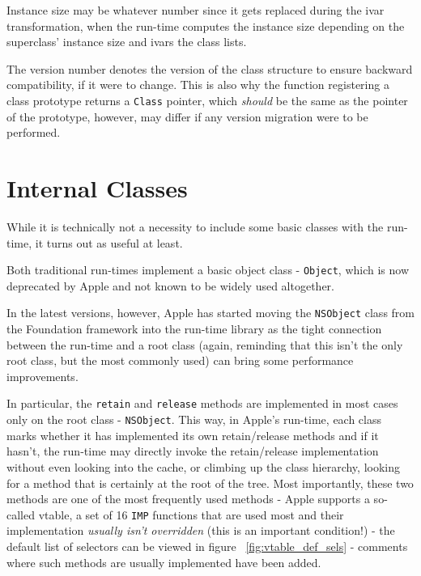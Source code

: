 Instance size may be whatever number since it gets replaced during the ivar transformation, when the run-time computes the instance size depending on the superclass' instance size and ivars the class lists.

The version number denotes the version of the class structure to ensure backward compatibility, if it were to change. This is also why the function registering a class prototype returns a \verb=Class= pointer, which \emph{should} be the same as the pointer of the prototype, however, may differ if any version migration were to be performed.

\section{Internal Classes}

While it is technically not a necessity to include some basic classes with the run-time, it turns out as useful at least.

Both traditional run-times implement a basic object class - \verb=Object=, which is now deprecated by Apple and not known to be widely used altogether.

In the latest versions, however, Apple has started moving the \verb=NSObject= class from the Foundation framework into the run-time library as the tight connection between the run-time and a root class (again, reminding that this isn't the only root class, but the most commonly used) can bring some performance improvements.

In particular, the \verb=retain= and \verb=release= methods are implemented in most cases only on the root class - \verb=NSObject=. This way, in Apple's run-time, each class marks whether it has implemented its own retain/release methods and if it hasn't, the run-time may directly invoke the retain/release implementation without even looking into the cache, or climbing up the class hierarchy, looking for a method that is certainly at the root of the tree. Most importantly, these two methods are one of the most frequently used methods - Apple supports a so-called vtable, a set of 16 \verb=IMP= functions that are used most and their implementation \emph{usually isn't overridden} (this is an important condition!) - the default list of selectors can be viewed in figure ~\ref{fig:vtable_def_sels} - comments where such methods are usually implemented have been added.

